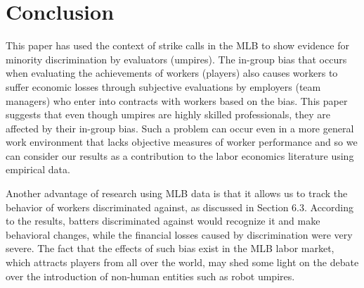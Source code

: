 \documentclass[dvipdfmx, 12pt]{jsarticle}
\begin{document}
\section{Conclusion}

This paper has used the context of strike calls in the MLB to show evidence for minority discrimination by evaluators (umpires). The in-group bias that occurs when evaluating the achievements of workers (players) also causes workers to suffer economic losses through subjective evaluations by employers (team managers) who enter into contracts with workers based on the bias. This paper suggests that even though umpires are highly skilled professionals, they are affected by their in-group bias. Such a problem can occur even in a more general work environment that lacks objective measures of worker performance and so we can consider our results as a contribution to the labor economics literature using empirical data.

Another advantage of research using MLB data is that it allows us to track the behavior of workers discriminated against, as discussed in Section 6.3. According to the results, batters discriminated against would recognize it and make behavioral changes, while the financial losses caused by discrimination were very severe. The fact that the effects of such bias exist in the MLB labor market, which attracts players from all over the world, may shed some light on the debate over the introduction of non-human entities such as robot umpires.


\nocite{Parsons_etal_2011}
\nocite{Tainsky_etal_2015}
\nocite{Agan_2018}
\nocite{Ashenfelter1987}
\nocite{Archsmith2021}
\nocite{baseballsavant}
\nocite{bbref}
\nocite{fg}
\nocite{chadwick}
\nocite{retrosheets}
\nocite{Angrist2014}
\nocite{Fiva2016}
\nocite{Jiang2019}
\nocite{MCCORMICK2001201}
\nocite{Kim2014}
\nocite{jiang_qian_yonker_2019}
\nocite{chen_et_al_2016}
\nocite{mlbam}



%
\end{document}
